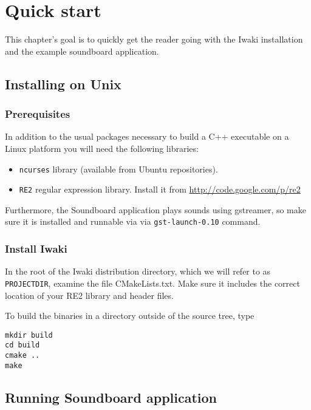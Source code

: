 \chapter{Quick start} %
\label{Chapter2}

This chapter's goal is to quickly get the reader going with the Iwaki installation and the example soundboard application. 

\section{Installing on Unix}

\subsection{Prerequisites}

In addition to the usual packages necessary to build a C++ executable on a Linux platform you will need the following libraries:

\begin{itemize}
\item \texttt{ncurses} library (available from Ubuntu repositories).
\item \texttt{RE2} regular expression library. Install it from \url{http://code.google.com/p/re2}
\end{itemize}

Furthermore, the Soundboard application plays sounds using gstreamer, so make sure it is installed and runnable via via \texttt{gst-launch-0.10} command.

\subsection{Install Iwaki}

In the root of the Iwaki distribution directory, which we will refer to as \texttt{PROJECTDIR}, examine the file CMakeLists.txt. Make sure it includes the correct location of your RE2 library and header files.

To build the binaries in a directory outside of the source tree, type
\lstset{language=bash}
\begin{lstlisting}
mkdir build
cd build
cmake ..
make
\end{lstlisting}

\section{Running Soundboard application}

